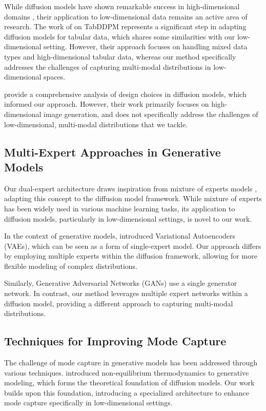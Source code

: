 \documentclass{article} %
\begin{document}
While diffusion models have shown remarkable success in high-dimensional domains \cite{ddpm,yang2023diffusion}, their application to low-dimensional data remains an active area of research. The work of \citet{kotelnikov2022tabddpm} on TabDDPM represents a significant step in adapting diffusion models for tabular data, which shares some similarities with our low-dimensional setting. However, their approach focuses on handling mixed data types and high-dimensional tabular data, whereas our method specifically addresses the challenges of capturing multi-modal distributions in low-dimensional spaces.

\citet{edm} provide a comprehensive analysis of design choices in diffusion models, which informed our approach. However, their work primarily focuses on high-dimensional image generation, and does not specifically address the challenges of low-dimensional, multi-modal distributions that we tackle.

\subsection{Multi-Expert Approaches in Generative Models}

Our dual-expert architecture draws inspiration from mixture of experts models \cite{goodfellow2016deep}, adapting this concept to the diffusion model framework. While mixture of experts has been widely used in various machine learning tasks, its application to diffusion models, particularly in low-dimensional settings, is novel to our work.

In the context of generative models, \citet{vae} introduced Variational Autoencoders (VAEs), which can be seen as a form of single-expert model. Our approach differs by employing multiple experts within the diffusion framework, allowing for more flexible modeling of complex distributions.

Similarly, Generative Adversarial Networks (GANs) \cite{gan} use a single generator network. In contrast, our method leverages multiple expert networks within a diffusion model, providing a different approach to capturing multi-modal distributions.

\subsection{Techniques for Improving Mode Capture}

The challenge of mode capture in generative models has been addressed through various techniques. \citet{pmlr-v37-sohl-dickstein15} introduced non-equilibrium thermodynamics to generative modeling, which forms the theoretical foundation of diffusion models. Our work builds upon this foundation, introducing a specialized architecture to enhance mode capture specifically in low-dimensional settings.
\end{document}
